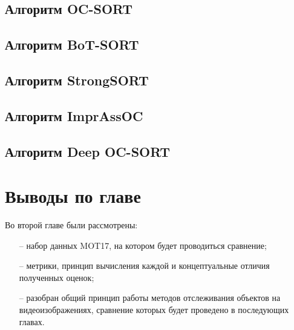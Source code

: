 \subsection{Алгоритм OC-SORT}


\subsection{Алгоритм BoT-SORT}


\subsection{Алгоритм StrongSORT}


\subsection{Алгоритм ImprAssOC}


\subsection{Алгоритм Deep OC-SORT}


\section{Выводы по главе}
Во второй главе были рассмотрены:
\begin{itemize}
  \item[--] набор данных MOT17, на котором будет проводиться сравнение;
  \item[--] метрики, принцип вычисления каждой и концептуальные отличия полученных оценок;
  \item[--] разобран общий принцип работы методов отслеживания объектов на видеоизображениях, сравнение которых будет проведено в последующих главах.  
\end{itemize}